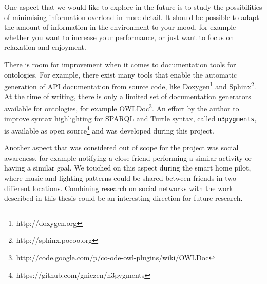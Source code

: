 One aspect that we would like to explore in the future is to study the possibilities of minimising information overload in more detail. It should be possible to adapt the amount of information in the environment to your mood, for example whether you want to increase your performance, or just want to focus on relaxation and enjoyment.


There is room for improvement when it comes to documentation tools for ontologies. For example, there exist many tools that enable the automatic generation of \ac{API} documentation from source code, like Doxygen\footnote{http://doxygen.org} and Sphinx\footnote{http://sphinx.pocoo.org}. At the time of writing, there is only a limited set of documentation generators available for ontologies, for example OWLDoc\footnote{http://code.google.com/p/co-ode-owl-plugins/wiki/OWLDoc}. An effort by the author to improve syntax highlighting for \ac{SPARQL} and Turtle syntax, called \texttt{n3pygments}, is available as open source\footnote{https://github.com/gniezen/n3pygments} and was developed during this project.


Another aspect that was considered out of scope for the pro\-ject was social awareness, for example notifying a close friend per\-form\-ing a similar activity or having a similar goal. We touch\-ed on this aspect during the smart home pilot, where music and lighting patterns could be shared between friends in two different locations. Combining research on social networks with the work described in this thesis could be an interesting direction for future research.


